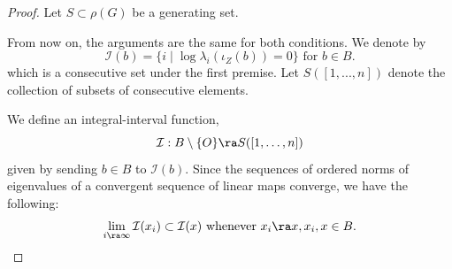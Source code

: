 \begin{proof}

Let $S \subset \rho(G)$ be a generating set. 


From now on, the arguments are the same for both conditions.
We denote by 
\[\mathcal{I}(b)=\{ i \mid \log \lambda_i(\iota_Z(b)) = 0\} \text{ for } b \in B.\] 
which is a consecutive set under the first premise.
	 Let $S([1, ..., n])$ denote the collection of 
	 subsets of consecutive elements.
  
	 We define an integral-interval function,
	 \[\mathcal{I}: B \setminus \{O\} \ra S([1, \dots, n])\]
	 given by sending $b \in B$ to $\mathcal{I}(b)$. 
 Since the sequences of
ordered norms of eigenvalues of a convergent sequence of linear maps converge,
we have the following: 
	 \begin{equation} \label{eqn:limI} 
	 \lim_{i\ra \infty} \mathcal{I}(x_i) \subset \mathcal{I}(x) \text{ whenever } 
	 x_i \ra x, x_i, x\in B.
	 \end{equation}
 
 	
 

\end{proof}
